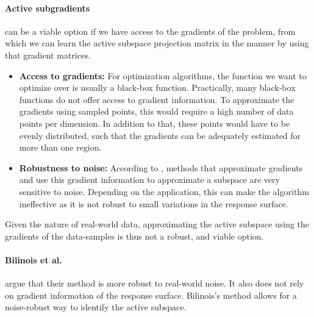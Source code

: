 \paragraph{Active subgradients} can be a viable option if we have access to the gradients of the problem, from which we can learn the active subspace projection matrix in the manner by using that gradient matrices.

\begin{itemize}

\item \textbf{Access to gradients:} For optimization algorithms, the function we want to optimize over is usually a black-box function.
Practically, many black-box functions do not offer access to gradient information.
To approximate the gradients using sampled points, this would require a high number of data points per dimension.
In addition to that, these points would have to be evenly distributed, such that the gradients can be adequately estimated for more than one region.

\item \textbf{Robustness to noise:} According to \citep{Tripathy}, methods that approximate gradients and use this gradient information to approximate a subspace are very sensitive to noise.
Depending on the application, this can make the algorithm ineffective as it is not robust to small variations in the response surface.

\end{itemize}

Given the nature of real-world data, approximating the active subspace using the gradients of the data-samples is thus not a robust, and viable option.

\paragraph{Bilinois et al.} argue that their method is more robust to real-world noise. 
It also does not rely on gradient information of the response surface.
Bilinois's method allows for a noise-robust way to identify the active subspace.

